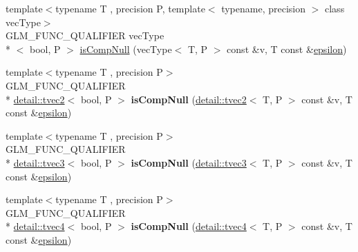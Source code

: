 \begin{DoxyCompactItemize}
\item 
{\footnotesize template$<$typename T , precision P, template$<$ typename, precision $>$ class vec\-Type$>$ }\\G\-L\-M\-\_\-\-F\-U\-N\-C\-\_\-\-Q\-U\-A\-L\-I\-F\-I\-E\-R vec\-Type\\*
$<$ bool, P $>$ \hyperlink{group__gtx__vector__query_ga93ecd4137480483ce1af0de8bbbf6546}{is\-Comp\-Null} (vec\-Type$<$ T, P $>$ const \&v, T const \&\hyperlink{group__gtc__constants_gacb41049b8d22c8aa90e362b96c524feb}{epsilon})
\item 
\hypertarget{namespaceglm_aebe68f230864fef7977c028095daed90}{{\footnotesize template$<$typename T , precision P$>$ }\\G\-L\-M\-\_\-\-F\-U\-N\-C\-\_\-\-Q\-U\-A\-L\-I\-F\-I\-E\-R \\*
\hyperlink{structglm_1_1detail_1_1tvec2}{detail\-::tvec2}$<$ bool, P $>$ {\bfseries is\-Comp\-Null} (\hyperlink{structglm_1_1detail_1_1tvec2}{detail\-::tvec2}$<$ T, P $>$ const \&v, T const \&\hyperlink{group__gtc__constants_gacb41049b8d22c8aa90e362b96c524feb}{epsilon})}\label{namespaceglm_aebe68f230864fef7977c028095daed90}

\item 
\hypertarget{namespaceglm_a2887bbd9268d732d99ee19e4d7c8d409}{{\footnotesize template$<$typename T , precision P$>$ }\\G\-L\-M\-\_\-\-F\-U\-N\-C\-\_\-\-Q\-U\-A\-L\-I\-F\-I\-E\-R \\*
\hyperlink{structglm_1_1detail_1_1tvec3}{detail\-::tvec3}$<$ bool, P $>$ {\bfseries is\-Comp\-Null} (\hyperlink{structglm_1_1detail_1_1tvec3}{detail\-::tvec3}$<$ T, P $>$ const \&v, T const \&\hyperlink{group__gtc__constants_gacb41049b8d22c8aa90e362b96c524feb}{epsilon})}\label{namespaceglm_a2887bbd9268d732d99ee19e4d7c8d409}

\item 
\hypertarget{namespaceglm_a4d5c5e644868935f8825fbe6a66ca562}{{\footnotesize template$<$typename T , precision P$>$ }\\G\-L\-M\-\_\-\-F\-U\-N\-C\-\_\-\-Q\-U\-A\-L\-I\-F\-I\-E\-R \\*
\hyperlink{structglm_1_1detail_1_1tvec4}{detail\-::tvec4}$<$ bool, P $>$ {\bfseries is\-Comp\-Null} (\hyperlink{structglm_1_1detail_1_1tvec4}{detail\-::tvec4}$<$ T, P $>$ const \&v, T const \&\hyperlink{group__gtc__constants_gacb41049b8d22c8aa90e362b96c524feb}{epsilon})}\label{namespaceglm_a4d5c5e644868935f8825fbe6a66ca562}


\end{DoxyCompactItemize}
